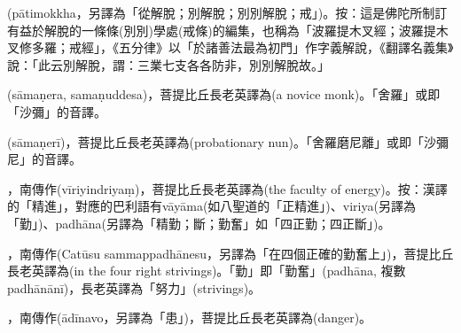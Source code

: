 \startitemgroup[noteitems]
\item{}(pātimokkha，另譯為「從解脫；別解脫；別別解脫；戒」)。按：這是佛陀所制訂有益於解脫的一條條(別別)學處(戒條)的編集，也稱為「波羅提木叉經；波羅提木叉修多羅；戒經」，《五分律》以「於諸善法最為初門」作字義解說，《翻譯名義集》說：「此云別解脫，謂：三業七支各各防非，別別解脫故。」
\stopitemgroup

\startitemgroup[noteitems]
\item{}(sāmaṇera, samaṇuddesa)，菩提比丘長老英譯為(a novice monk)。「舍羅」或即「沙彌」的音譯。
\item{}(sāmaṇerī)，菩提比丘長老英譯為(probationary nun)。「舍羅磨尼離」或即「沙彌尼」的音譯。
\stopitemgroup

\startitemgroup[noteitems]
\item{}，南傳作(vīriyindriyaṃ)，菩提比丘長老英譯為(the faculty of energy)。按：漢譯的「精進」，對應的巴利語有vāyāma(如八聖道的「正精進」)、viriya(另譯為「勤」)、padhāna(另譯為「精勤；斷；勤奮」如「四正勤；四正斷」)。
\stopitemgroup

\startitemgroup[noteitems]
\item{}，南傳作(Catūsu sammappadhānesu，另譯為「在四個正確的勤奮上」)，菩提比丘長老英譯為(in the four right strivings)。「勤」即「勤奮」(padhāna, 複數padhānānī)，長老英譯為「努力」(strivings)。
\stopitemgroup

\startitemgroup[noteitems]
\item{}，南傳作(ādīnavo，另譯為「患」)，菩提比丘長老英譯為(danger)。
\stopitemgroup

